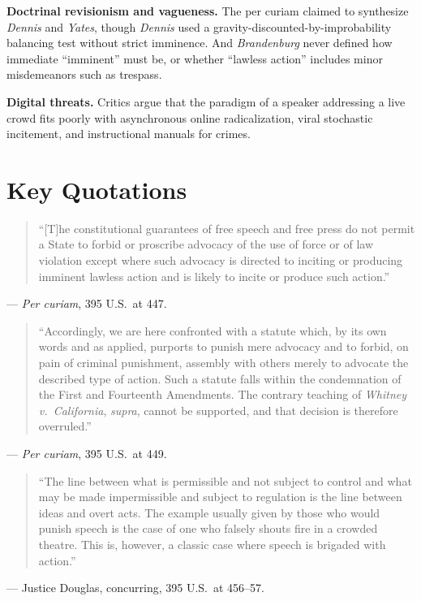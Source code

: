 \documentclass[12pt]{article}
\begin{document}
\textbf{Doctrinal revisionism and vagueness.} The per curiam claimed to synthesize \textit{Dennis} and \textit{Yates}, though \textit{Dennis} used a gravity-discounted-by-improbability balancing test without strict imminence. And \textit{Brandenburg} never defined how immediate ``imminent'' must be, or whether ``lawless action'' includes minor misdemeanors such as trespass.

\textbf{Digital threats.} Critics argue that the paradigm of a speaker addressing a live crowd fits poorly with asynchronous online radicalization, viral stochastic incitement, and instructional manuals for crimes.

\section{Key Quotations}

\begin{quote}
``[T]he constitutional guarantees of free speech and free press do not permit a State to forbid or proscribe advocacy of the use of force or of law violation except where such advocacy is directed to inciting or producing imminent lawless action and is likely to incite or produce such action.''
\end{quote}
\noindent --- \emph{Per curiam}, 395 U.S.\ at 447.

\begin{quote}
``Accordingly, we are here confronted with a statute which, by its own words and as applied, purports to punish mere advocacy and to forbid, on pain of criminal punishment, assembly with others merely to advocate the described type of action. Such a statute falls within the condemnation of the First and Fourteenth Amendments. The contrary teaching of \emph{Whitney v.\ California}, \emph{supra}, cannot be supported, and that decision is therefore overruled.''
\end{quote}
\noindent --- \emph{Per curiam}, 395 U.S.\ at 449.

\begin{quote}
``The line between what is permissible and not subject to control and what may be made impermissible and subject to regulation is the line between ideas and overt acts. The example usually given by those who would punish speech is the case of one who falsely shouts fire in a crowded theatre. This is, however, a classic case where speech is brigaded with action.''
\end{quote}
\noindent --- Justice Douglas, concurring, 395 U.S.\ at 456--57.
\end{document}
